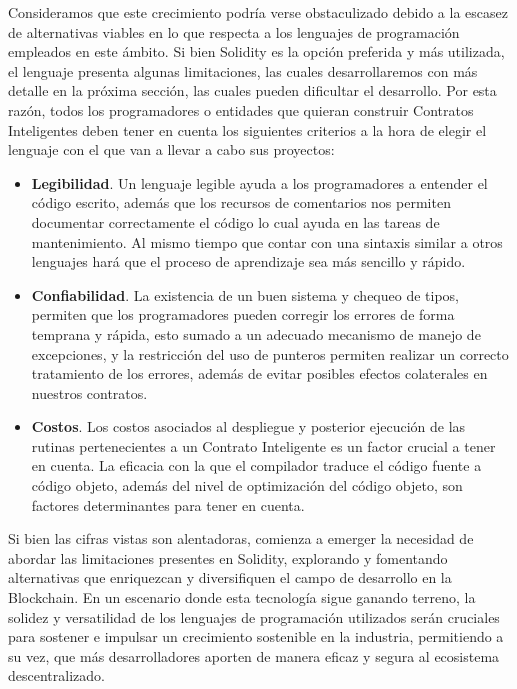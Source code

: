 \documentclass[a4paper,10pt]{article}
\begin{document}
	Consideramos que este crecimiento podría verse obstaculizado debido a la escasez de alternativas viables en lo que respecta a los lenguajes de programación empleados en este ámbito. Si bien Solidity es la opción preferida y más utilizada, el lenguaje presenta algunas limitaciones, las cuales desarrollaremos con más detalle en la próxima sección, las cuales pueden dificultar el desarrollo. Por esta razón, todos los programadores o entidades que quieran construir Contratos Inteligentes deben tener en cuenta los siguientes criterios a la hora de elegir el lenguaje con el que van a llevar a cabo sus proyectos:
	\begin{itemize}
		\item \textbf{Legibilidad}. Un lenguaje legible ayuda a los programadores a entender el código escrito, además que los recursos de comentarios nos permiten documentar correctamente el código lo cual ayuda en las tareas de mantenimiento. Al mismo tiempo que contar con una sintaxis similar a otros lenguajes hará que el proceso de aprendizaje sea más sencillo y rápido.
		\item \textbf{Confiabilidad}. La existencia de un buen sistema y chequeo de tipos, permiten que los programadores pueden corregir los errores de forma temprana y rápida, esto sumado a un adecuado mecanismo de manejo de excepciones, y la restricción del uso de punteros permiten realizar un correcto tratamiento de los errores, además de evitar posibles efectos colaterales en nuestros contratos.
		\item \textbf{Costos}. Los costos asociados al despliegue y posterior ejecución de las rutinas pertenecientes a un Contrato Inteligente es un factor crucial a tener en cuenta. La eficacia con la que el compilador traduce el código fuente a código objeto, además del nivel de optimización del código objeto, son factores determinantes para tener en cuenta.
	\end{itemize}
	Si bien las cifras vistas son alentadoras, comienza a emerger la necesidad de abordar las limitaciones presentes en Solidity, explorando y fomentando alternativas que enriquezcan y diversifiquen el campo de desarrollo en la Blockchain. En un escenario donde esta tecnología sigue ganando terreno, la solidez y versatilidad de los lenguajes de programación utilizados serán cruciales para sostener e impulsar un crecimiento sostenible en la industria, permitiendo a su vez, que más desarrolladores aporten de manera eficaz y segura al ecosistema descentralizado.
\end{document}
